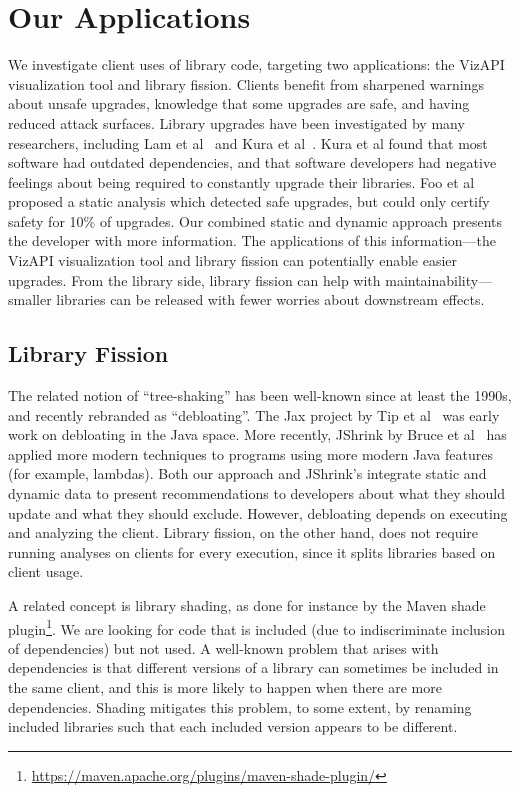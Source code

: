 \section{Our Applications}
We investigate client uses of library code, targeting two applications: the VizAPI visualization tool and library fission. Clients benefit from sharpened warnings about unsafe upgrades, knowledge that some upgrades are safe, and having reduced attack surfaces. Library upgrades have been investigated by many researchers, including Lam et al~\cite{lam20:_puttin_seman_seman_version} and Kura et al~\cite{kula18:_do_devel_updat_their_librar_depen}. Kura et al found that most software had outdated dependencies, and that software developers had negative feelings about being required to constantly upgrade their libraries. Foo et al~\cite{foo18:_effic_static_check_librar_updat} proposed a static analysis which detected safe upgrades, but could only certify safety for 10\% of upgrades. Our combined static and dynamic approach presents the developer with more information. The applications of this information---the VizAPI visualization tool and library fission can potentially enable easier upgrades. From the library side, library fission can help with maintainability---smaller libraries can be released with fewer worries about downstream effects.

\subsection{Library Fission}
\label{sec:related-fission}

The related notion of ``tree-shaking'' has been well-known since at least the 1990s, and recently rebranded as ``debloating''.
The Jax project by Tip et al~\cite{tip02:_pract_extrac_techn_java} was early work on debloating in the Java space.
More recently, JShrink by Bruce et al~\cite{bruce20:_jshrin} has applied more modern techniques to programs using more modern Java features (for example, lambdas).
Both our approach and JShrink's integrate static and dynamic data to present recommendations to developers about what they should update and what they should exclude.
However, debloating depends on executing and analyzing the client. Library fission, on the other hand, does not require running analyses on clients for every execution, since it splits libraries based on client usage.

A related concept is library shading, as done for instance by the Maven shade plugin\footnote{\url{https://maven.apache.org/plugins/maven-shade-plugin/}}. We are looking for code that is included (due to indiscriminate inclusion of dependencies) but not used. A well-known problem that arises with dependencies is that different versions of a library can sometimes be included in the same client, and this is more likely to happen when there are more dependencies. Shading mitigates this problem, to some extent, by renaming included libraries such that each included version appears to be different.

